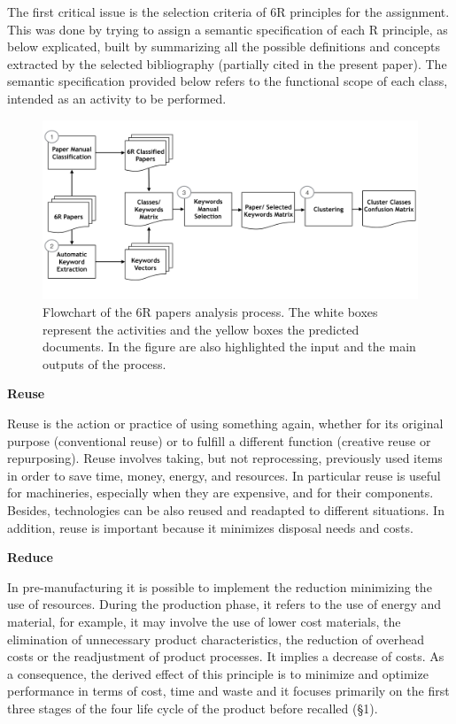 \documentclass[]{book}
\begin{document}
The first critical issue is the selection criteria of 6R principles for
the assignment. This was done by trying to assign a semantic
specification of each R principle, as below explicated, built by
summarizing all the possible definitions and concepts extracted by the
selected bibliography (partially cited in the present paper). The
semantic specification provided below refers to the functional scope of
each class, intended as an activity to be performed.

\begin{figure}

{\centering \includegraphics[width=0.8\linewidth]{_bookdown_files/figures/workflow_sm} 

}

\caption{Flowchart of the 6R papers analysis process. The white boxes represent the activities and the yellow boxes the predicted documents. In the figure are also highlighted the input and the main outputs of the process.}\label{fig:wfsm}
\end{figure}

\textbf{Reuse}

Reuse is the action or practice of using something again, whether for
its original purpose (conventional reuse) or to fulfill a different
function (creative reuse or repurposing). Reuse involves taking, but not
reprocessing, previously used items in order to save time, money,
energy, and resources. In particular reuse is useful for machineries,
especially when they are expensive, and for their components. Besides,
technologies can be also reused and readapted to different situations.
In addition, reuse is important because it minimizes disposal needs and
costs.

\textbf{Reduce}

In pre-manufacturing it is possible to implement the reduction
minimizing the use of resources. During the production phase, it refers
to the use of energy and material, for example, it may involve the use
of lower cost materials, the elimination of unnecessary product
characteristics, the reduction of overhead costs or the readjustment of
product processes. It implies a decrease of costs. As a consequence, the
derived effect of this principle is to minimize and optimize performance
in terms of cost, time and waste and it focuses primarily on the first
three stages of the four life cycle of the product before recalled (§1).
\end{document}
